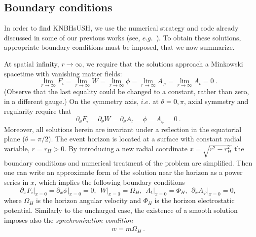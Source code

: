 \subsection{Boundary conditions}
\label{sec_bc}
In order to find KNBHsUSH, we use the numerical strategy and code already discussed in some of our previous works (see, $e.g.$~\cite{Herdeiro:2015gia,Herdeiro:2016tmi}). To obtain these solutions, appropriate boundary conditions must be imposed, that we now summarize.
  
At spatial infinity, $r\rightarrow\infty$, we require that the solutions approach a Minkowski spacetime
with vanishing matter fields:
\begin{equation}
  \lim_{r\rightarrow \infty}{F_i}=\lim_{r\rightarrow \infty}{W}=\lim_{r\rightarrow \infty}{\phi}=\lim_{r\rightarrow\infty}A_\varphi=\lim_{r\rightarrow\infty}A_t=0\ .
\end{equation}
(Observe that the last equality could be changed to a constant, rather than zero, in a different gauge.) 
%
On the symmetry axis, $i.e.$ at $\theta=0,\pi$, axial symmetry and regularity require that
\begin{equation}
\partial_\theta F_i = \partial_\theta W = \partial_\theta A_t = \phi = A_\varphi = 0\ .
\end{equation} 
%
Moreover, all solutions herein are invariant under a reflection in the equatorial plane ($\theta=\pi/2$).
The event horizon is located at a surface with constant radial variable, $r=r_H>0$.
By introducing a new radial coordinate $x=\sqrt{r^2-r_H^2}$ 
the boundary conditions and numerical treatment of the problem are simplified.
Then one can write an approximate form of the solution  near the horizon as a power series in $x$,
which implies the following boundary conditions
\begin{equation}
\partial_x F_i \big|_{x=0}= \partial_x \phi  \big|_{x=0} =  0,~~W \big|_{x=0}=\Omega_H,~~
A_t \big|_{x=0} =  \Phi_H,~~ \partial_x A_\varphi \big|_{x=0}=0 ,
\label{bch1}
\end{equation}
where $\Omega_H $ is the horizon angular velocity
and $\Phi_H$ is the horizon electrostatic potential. 
Similarly to the uncharged case, the existence of a smooth solution imposes also the
\textit{synchronization condition}
%
\begin{eqnarray}
\label{cond}
w=m\Omega_H\ .
\end{eqnarray}
%
 



